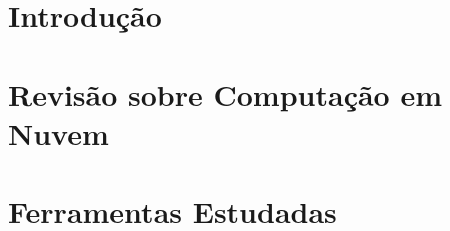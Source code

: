 \documentclass[	12pt, openright, twoside, a4paper, english, brazil]{abntex2}
\begin{document}
\frenchspacing 



\clearpage



\imprimirfolhaderosto*


\clearpage






\clearpage









\listoffigures*
\cleardoublepage


\listoftables*
\cleardoublepage


\clearpage



\tableofcontents*
\cleardoublepage


\textual


\chapter{Introdução}
\label{cap:introducao}



\chapter{Revisão sobre Computação em Nuvem}
\label{cap:fundTeorica}


\chapter{Ferramentas Estudadas}
\label{cap:ferramentas}


\end{document}
